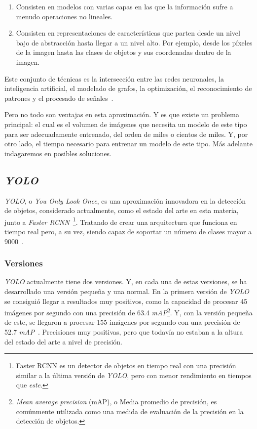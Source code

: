 \begin{enumerate}
	\item Consisten en modelos con varias capas en las que la información sufre a menudo operaciones no lineales.
	\item Consisten en representaciones de características que parten desde un nivel bajo de abstracción hasta llegar a un nivel alto. Por ejemplo, desde los píxeles de la imagen hasta las clases de objetos y sus coordenadas dentro de la imagen.
\end{enumerate}

Este conjunto de técnicas es la intersección entre las redes neuronales, la inteligencia artificial, el modelado de grafos, la optimización, el reconocimiento de patrones y el procesado de señales~\cite{ms:deeplearning}. %

Pero no todo son ventajas en esta aproximación. Y es que existe un problema principal: el cual es el volumen de imágenes que necesita un modelo de este tipo para ser adecuadamente entrenado, del orden de miles o cientos de miles. Y, por otro lado, el tiempo necesario para entrenar un modelo de este tipo. Más adelante indagaremos en posibles soluciones.

\subsection{\textit{YOLO}}

\textit{YOLO}, o \textit{You Only Look Once}, es una aproximación innovadora en la detección de objetos, considerado actualmente, como el estado del arte en esta materia, junto a \textit{Faster RCNN}~\cite{faster-rcnn}\footnote{Faster RCNN es un detector de objetos en tiempo real con una precisión similar a la última versión de \textit{YOLO}, pero con menor rendimiento en tiempos que \textit{este}.}. Tratando de crear una arquitectura que funciona en tiempo real pero, a su vez, siendo capaz de soportar un número de clases mayor a 9000~\cite{yolov2}.

\subsubsection{Versiones}

\textit{YOLO} actualmente tiene dos versiones. Y, en cada una de estas versiones, se ha desarrollado una versión pequeña y una normal. En la primera versión de \textit{YOLO} se consiguió llegar a resultados muy positivos, como la capacidad de procesar 45 imágenes por segundo con una precisión de 63.4 \textit{mAP}\footnote{\textit{Mean average precision} (mAP), o Media promedio de precisión, es comúnmente utilizada como una medida de evaluación de la precisión en la detección de objetos.}. Y, con la versión pequeña de este, se llegaron a procesar 155 imágenes por segundo con una precisión de 52.7 \textit{mAP}~\cite{yolo}. Precisiones muy positivas, pero que todavía no estaban a la altura del estado del arte a nivel de precisión.

